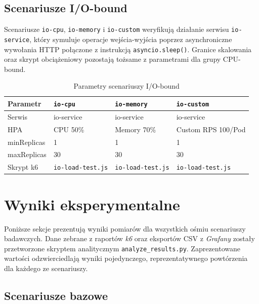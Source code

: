 \subsection{Scenariusze I/O-bound}

Scenariusze \texttt{io-cpu}, \texttt{io-memory} i \texttt{io-custom} weryfikują działanie serwisu \texttt{io-service}, który symuluje operacje wejścia-wyjścia poprzez asynchroniczne wywołania HTTP połączone z instrukcją \texttt{asyncio.sleep()}. Granice skalowania oraz skrypt obciążeniowy pozostają tożsame z parametrami dla grupy CPU-bound.

\begin{table}[H]
  \centering
  \begin{tabularx}{\textwidth}{|l|X|X|X|}
    \hline
    \textbf{Parametr} & \texttt{io-cpu} & \texttt{io-memory} & \texttt{io-custom} \\
    \hline
    Serwis & io-service & io-service & io-service \\
    HPA & CPU 50\% & Memory 70\% & Custom RPS 100/Pod \\
    minReplicas & 1 & 1 & 1 \\
    maxReplicas & 30 & 30 & 30 \\
    Skrypt k6 & \texttt{io-load-test.js} & \texttt{io-load-test.js} & \texttt{io-load-test.js} \\
    \hline
  \end{tabularx}
  \caption{Parametry scenariuszy I/O-bound}
  \label{tab:io-scenarios}
\end{table}

\section{Wyniki eksperymentalne}

Poniższe sekcje prezentują wyniki pomiarów dla wszystkich ośmiu scenariuszy badawczych. Dane zebrane z raportów \textit{k6} oraz eksportów CSV z \textit{Grafany} zostały przetworzone skryptem analitycznym \texttt{analyze\_results.py}. Zaprezentowane wartości odzwierciedlają wyniki pojedynczego, reprezentatywnego powtórzenia dla każdego ze scenariuszy.

\subsection{Scenariusze bazowe}

